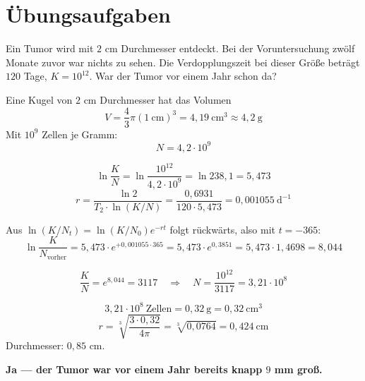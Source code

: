 \begin{warnung}
\begin{center}
\begin{minipage}{0.88\textwidth}
\end{minipage}
\end{center}
\end{warnung}

\section{Übungsaufgaben}

\begin{aufgabe}
Ein Tumor wird mit $2$ cm Durchmesser entdeckt. Bei der Voruntersuchung zwölf Monate zuvor war nichts zu sehen. Die Verdopplungszeit bei dieser Größe beträgt $120$ Tage, $K = 10^{12}$. War der Tumor vor einem Jahr schon da?

\loesung
{}
Eine Kugel von $2$ cm Durchmesser hat das Volumen
\[ V = \frac{4}{3}\pi\left(1\ \mathrm{cm}\right)^{3} = 4{,}19\ \mathrm{cm^3} \approx 4{,}2\ \mathrm{g} \]
Mit $10^{9}$ Zellen je Gramm:
\[ N = 4{,}2\cdot10^{9} \]

\[ \ln\frac{K}{N} = \ln\frac{10^{12}}{4{,}2\cdot10^{9}} = \ln 238{,}1 = 5{,}473 \]
\[ r = \frac{\ln 2}{T_2 \cdot \ln(K/N)} = \frac{0{,}6931}{120 \cdot 5{,}473} = 0{,}001055\ \mathrm{d}^{-1} \]

Aus $\ln(K/N_t) = \ln(K/N_0)e^{-rt}$ folgt rückwärts, also mit $t = -365$:
\[ \ln\frac{K}{N_{\text{vorher}}} = 5{,}473 \cdot e^{+0{,}001055 \cdot 365} = 5{,}473 \cdot e^{0{,}3851} = 5{,}473 \cdot 1{,}4698 = 8{,}044 \]

\[ \frac{K}{N} = e^{8{,}044} = 3117 \quad\Longrightarrow\quad N = \frac{10^{12}}{3117} = 3{,}21\cdot10^{8} \]

\[ 3{,}21\cdot10^{8}\ \text{Zellen} = 0{,}32\ \mathrm{g} = 0{,}32\ \mathrm{cm^3} \]
\[ r = \sqrt[3]{\frac{3 \cdot 0{,}32}{4\pi}} = \sqrt[3]{0{,}0764} = 0{,}424\ \mathrm{cm} \]
Durchmesser: $0{,}85$ cm.

\begin{center}
\begin{minipage}{0.9\textwidth}
\textbf{Ja --- der Tumor war vor einem Jahr bereits knapp $9$ mm groß.}
\end{minipage}
\end{center}


\end{aufgabe}
